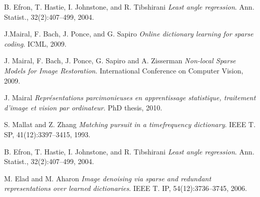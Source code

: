 \documentclass{ipol}
\begin{document}
\begin{thebibliography}{9}

	B. Efron, T. Hastie, I. Johnstone, and R. Tibshirani
	\emph{Least angle regression}. 
	Ann. Statist.,
	32(2):407–499,
	2004.

	J.Mairal, F. Bach, J. Ponce, and G. Sapiro
	\emph{Online dictionary learning for sparse coding}.
	ICML,
	2009.

	J. Mairal, F. Bach, J. Ponce, G. Sapiro and A. Zisserman
	\emph{ Non-local Sparse Models for Image Restoration}.
	International Conference on Computer Vision,
	2009.

	J. Mairal
	\emph{ Représentations parcimonieuses en apprentissage statistique, traitement d’image et
vision par ordinateur}.
	PhD thesis,
	2010.

	S. Mallat and Z. Zhang
 	\emph{Matching pursuit in a timefrequency dictionary}.
	IEEE T. SP,
	41(12):3397–3415,
	1993.

	B. Efron, T. Hastie, I. Johnstone, and R. Tibshirani
	\emph{ Least angle regression}.
	Ann. Statist.,
	32(2):407–499,
	2004.

	M. Elad and M. Aharon
	\emph{Image denoising via sparse and redundant representations over learned dictionaries}.
	IEEE T.
	IP, 54(12):3736–3745,
	2006.

\end{thebibliography}
\end{document}
